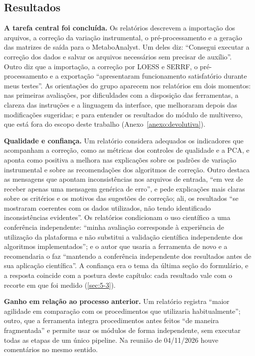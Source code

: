 \subsection{Resultados}\label{sec:5-4-4}

\textbf{A tarefa central foi concluída.} Os relatórios descrevem a importação dos arquivos, a correção da variação instrumental, o pré-processamento e a geração das matrizes de saída para o MetaboAnalyst. Um deles diz: ``Consegui executar a correção dos dados e salvar os arquivos necessários sem precisar de auxílio''. Outro diz que a importação, a correção por LOESS e SERRF, o pré-processamento e a exportação ``apresentaram funcionamento satisfatório durante meus testes''. As orientações do grupo aparecem nos relatórios em dois momentos: nas primeiras avaliações, por dificuldades com a disposição das ferramentas, a clareza das instruções e a linguagem da interface, que melhoraram depois das modificações sugeridas; e para entender os resultados do módulo de multiverso, que está fora do escopo deste trabalho (Anexo~\ref{anexo:devolutiva}).

\textbf{Qualidade e confiança.} Um relatório considera adequados os indicadores que acompanham a correção, como as métricas dos controles de qualidade e a PCA, e aponta como positiva a melhora nas explicações sobre os padrões de variação instrumental e sobre as recomendações dos algoritmos de correção. Outro destaca as mensagens que apontam inconsistências nos arquivos de entrada, ``em vez de receber apenas uma mensagem genérica de erro'', e pede explicações mais claras sobre os critérios e os motivos das sugestões de correção; ali, os resultados ``se mostraram coerentes com os dados utilizados, não tendo identificado inconsistências evidentes''. Os relatórios condicionam o uso científico a uma conferência independente: ``minha avaliação corresponde à experiência de utilização da plataforma e não substitui a validação científica independente dos algoritmos implementados''; e o autor que usaria a ferramenta de novo e a recomendaria o faz ``mantendo a conferência independente dos resultados antes de sua aplicação científica''. A confiança era o tema da última seção do formulário, e a resposta coincide com a postura deste capítulo: cada resultado vale com o recorte em que foi medido (\ref{sec:5-3}).

\textbf{Ganho em relação ao processo anterior.} Um relatório registra ``maior agilidade em comparação com os procedimentos que utilizaria habitualmente''; outro, que a ferramenta integra procedimentos antes feitos ``de maneira fragmentada'' e permite usar os módulos de forma independente, sem executar todas as etapas de um único pipeline. Na reunião de 04/11/2026 houve comentários no mesmo sentido.

